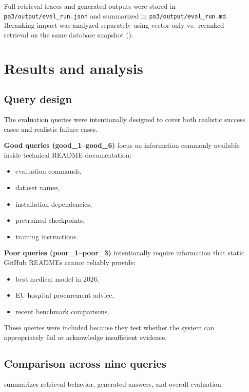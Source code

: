 \documentclass[11pt,a4paper]{article}
\begin{document}
Full retrieval traces and generated outputs were stored in \texttt{pa3/output/eval\_run.json} and summarized in \texttt{pa3/output/eval\_run.md}. Reranking impact was analyzed separately using vector-only vs.\ reranked retrieval on the same database snapshot ().

\section{Results and analysis}

\subsection{Query design}
The evaluation queries were intentionally designed to cover both realistic success cases and realistic failure cases.

\textbf{Good queries (good\_1--good\_6)} focus on information commonly available inside technical README documentation:

\begin{itemize}
  \item evaluation commands,
  \item dataset names,
  \item installation dependencies,
  \item pretrained checkpoints,
  \item training instructions.
\end{itemize}

\textbf{Poor queries (poor\_1--poor\_3)} intentionally require information that static GitHub READMEs cannot reliably provide:

\begin{itemize}
  \item best medical model in 2026,
  \item EU hospital procurement advice,
  \item recent benchmark comparisons.
\end{itemize}

These queries were included because they test whether the system can appropriately fail or acknowledge insufficient evidence.

\subsection{Comparison across nine queries}
 summarizes retrieval behavior, generated answers, and overall evaluation.
\end{document}
